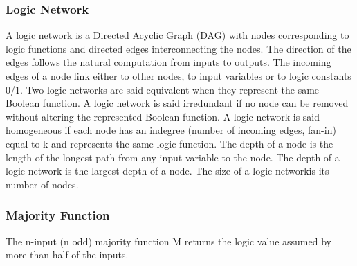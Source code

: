 \documentclass[
	accentcolor=1c,%
	type=intern,
	marginpar=false,
	ruledheaders=section,
	class=report,
	BCOR=5mm,
      parskip=half-,
	fontsize=10pt
	]{tudapub}
\begin{document}
{\subsubsection*{Logic Network}
A logic network is a Directed Acyclic Graph (DAG) with nodes corresponding to logic functions
and directed edges interconnecting the nodes. The direction of the edges follows the natural
computation from inputs to outputs. The incoming edges of a node link either to other nodes,
to input variables or to logic constants 0/1. Two logic networks are said equivalent when they
represent the same Boolean function. A logic network is said irredundant if no node can be
removed without altering the represented Boolean function. A logic network is said homogeneous
if each node has an indegree (number of incoming edges, fan-in) equal to k and represents the
same logic function. The depth of a node is the length of the longest path from any input
variable to the node. The depth of a logic network is the largest depth of a node.
The size of a logic networkis its number of nodes.
\newline

\subsubsection*{Majority Function}
The n-input (n odd) majority function M returns the logic value assumed by more than half
of the inputs.
\newline
}

\newpage
\end{document}
